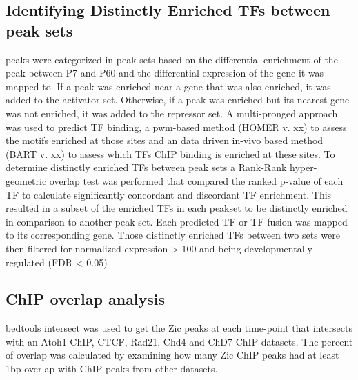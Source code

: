 \documentclass[fleqn,10pt]{wlscirep}
\begin{document}
\subsection*{Identifying Distinctly Enriched  TFs between peak sets}
peaks were categorized in peak sets based on the differential enrichment of the peak between P7 and P60 and the differential expression of the gene it was mapped to. If a peak was enriched near a gene that was also enriched, it was added to the activator set. Otherwise, if a peak was enriched but its nearest gene was not enriched, it was added to the repressor set. A multi-pronged approach was used to predict TF binding, a pwm-based method (HOMER v. xx) \cite{} to assess the motifs enriched at those sites and an data driven in-vivo based method (BART v. xx) \cite{Zhenjiawang2018BART:Profiles, Ma2021BARTweb:Analysis} to assess which TFs ChIP binding is enriched at these sites. To determine distinctly enriched TFs between peak sets a Rank-Rank hyper-geometric overlap test \cite{RRHO} was performed that compared the ranked p-value of each TF  to calculate significantly concordant and discordant TF enrichment. This resulted in a subset of the enriched TFs in each peakset to be distinctly enriched in comparison to another peak set.  Each predicted TF or TF-fusion was mapped to its corresponding gene. Those distinctly enriched TFs between two sets were then filtered for normalized expression > 100 and being developmentally regulated (FDR < 0.05)

\subsection*{ChIP overlap analysis}
bedtools intersect was used to get the Zic peaks at each time-point that intersects with an Atoh1 ChIP, CTCF, Rad21, Chd4 and ChD7 ChIP datasets. The percent of overlap was calculated by examining how many Zic ChIP peaks had at least 1bp overlap with ChIP peaks from other datasets. 
\end{document}
